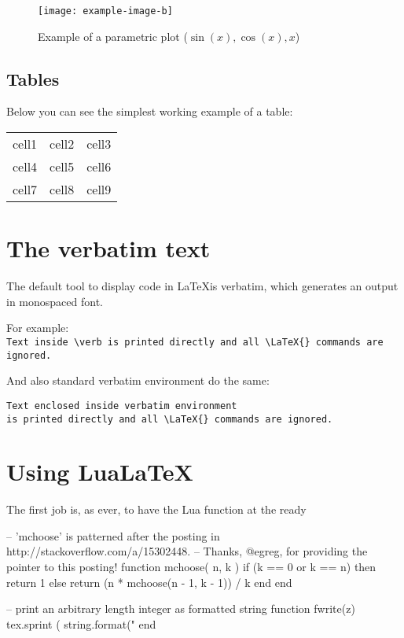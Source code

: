 \documentclass[12pt, letterpaper, twoside]{article}
\begin{document}
\begin{figure}[h!]
 \centering
 \texttt{[image: example-image-b]}
 \caption{Example of a parametric plot ($\sin (x), \cos(x), x$)}
\end{figure}

\subsection{Tables}
Below you can see the simplest working example of a table:
\begin{center}
\begin{tabular}{ |c|c|c| } 
 \hline
 cell1 & cell2 & cell3 \\ 
 cell4 & cell5 & cell6 \\ 
 cell7 & cell8 & cell9 \\ 
 \hline
\end{tabular}
\end{center}

\section{The verbatim text}
The default tool to display code in \LaTeX is verbatim, which generates an output in monospaced font.

For example:\\
\verb|Text inside \verb is printed directly and all \LaTeX{} commands are ignored.|

And also standard verbatim environment do the same:
\begin{verbatim}
Text enclosed inside verbatim environment 
is printed directly and all \LaTeX{} commands are ignored.
\end{verbatim}

\section{Using Lua\LaTeX}

The first job is, as ever, to have the Lua function at the ready
\begin{luacode}
   -- 'mchoose' is patterned after the posting in http://stackoverflow.com/a/15302448.
   -- Thanks, @egreg, for providing the pointer to this posting!
   function mchoose( n, k )
     if (k == 0 or k == n) then
       return 1 
     else 
       return (n * mchoose(n - 1, k - 1)) / k 
     end
   end

   -- print an arbitrary length integer as formatted string
   function fwrite(z) 
      tex.sprint ( string.format("%
   end
\end{luacode}
\end{document}
